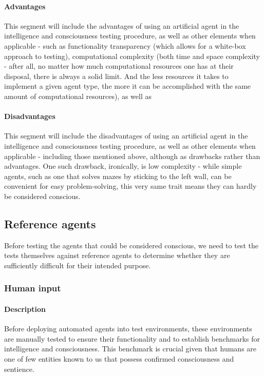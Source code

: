 \documentclass[masterthesis]{fer}
\begin{document}
\paragraph{Advantages}
This segment will include the advantages of using an artificial agent in the intelligence and consciousness testing procedure, as well as other elements when applicable - such as functionality transparency (which allows for a white-box approach to testing), computational complexity (both time and space complexity - after all, no matter how much computational resources one has at their disposal, there is always a solid limit. And the less resources it takes to implement a given agent type, the more it can be accomplished with the same amount of computational resources), as well as 
\paragraph{Disadvantages}
This segment will include the disadvantages of using an artificial agent in the intelligence and consciousness testing procedure, as well as other elements when applicable - including those mentioned above, although as drawbacks rather than advantages. One such drawback, ironically, is low complexity - while simple agents, such as one that solves mazes by sticking to the left wall, can be convenient for easy problem-solving, this very same trait means they can hardly be considered conscious.
\subsection{Reference agents}
Before testing the agents that could be considered conscious, we need to test the tests themselves against reference agents to determine whether they are sufficiently difficult for their intended purpose.
\subsubsection{Human input}

\paragraph{Description}
Before deploying automated agents into test environments, 
these environments are manually tested to ensure their functionality and to establish benchmarks for intelligence and consciousness. This benchmark is crucial given that humans are one of few entities known to us that possess confirmed consciousness and sentience.
\end{document}

